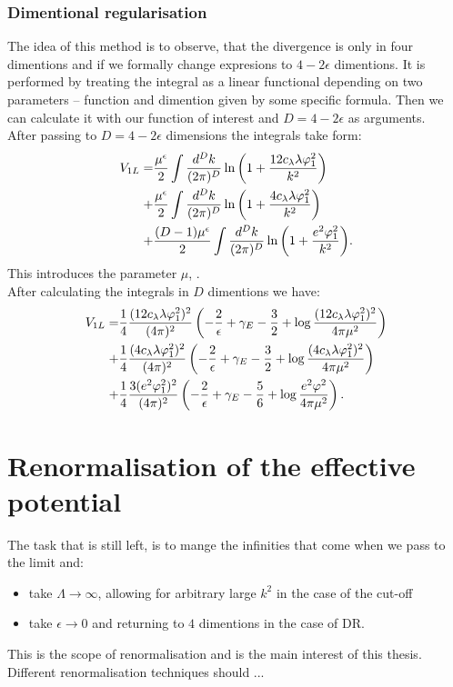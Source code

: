 \subsubsection{Dimentional regularisation}
The idea of this method is to observe, that the divergence is only in four dimentions 
and if we formally change expresions to $4-2\epsilon$ dimentions. 
It is performed by treating the integral as a linear functional depending on two parameters --
function and dimention given by some specific formula. Then we can calculate it with our 
function of interest and $D = 4-2\epsilon$ as arguments.  \\
After passing to $D=4-2\epsilon$ dimensions the integrals take form: 
\begin{align}
V_{1L}=&\frac{\mu^\epsilon}{2} \int\frac{d^Dk}{(2\pi)^D}\ln{\left(1+\frac{12c_\lambda\lambda\varphi_1^2}{k^2}
\right)}\\
+&\frac{\mu^\epsilon}{2} \int\frac{d^Dk}{(2\pi)^D}\ln{\left(1+\frac{4c_\lambda\lambda\varphi_1^2}{k^2}
\right)} \\ 
+&\frac{(D-1)\mu^\epsilon}{2} \int\frac{d^Dk}{(2\pi)^D}\ln{\left(1+\frac{e^2\varphi_1^2}{k^2}\right)}.
\end{align}
This introduces the parameter $\mu$, . \\
After calculating the integrals in $D$ dimentions we have:
\begin{align}
V_{1L}=&\frac{1}{4}\frac{(12c_\lambda\lambda\varphi_1^2)^2}{(4\pi)^2}\left(-\frac{2}{\epsilon}
+\gamma_E-\frac{3}{2}+\log{\frac{(12c_\lambda\lambda\varphi_1^2)^2}{4\pi\mu^2}}\right)  \\
+&\frac{1}{4}\frac{(4c_\lambda\lambda\varphi_1^2)^2}{(4\pi)^2}\left(-\frac{2}{\epsilon}
+\gamma_E-\frac{3}{2}+\log{\frac{(4c_\lambda\lambda\varphi_1^2)^2}{4\pi\mu^2}}\right)  \\
+&\frac{1}{4}\frac{3(e^2\varphi_1^2)^2}{(4\pi)^2}\left(-\frac{2}{\epsilon}+\gamma_E
-\frac{5}{6}+\log{\frac{e^2\varphi^2}{4\pi\mu^2}}\right).
\end{align}
\section{Renormalisation of the effective potential}
The task that is still left, is to mange the infinities that come when we pass to the limit 
and:
\begin{itemize} 
\item take $\Lambda \to \infty$, allowing for arbitrary large $k^2$ in the case of the cut-off
\item take $\epsilon \to 0$ and returning to $4$ dimentions in the case of DR.

\end{itemize}
This is the scope of renormalisation and is the main interest of this thesis. 
Different renormalisation techniques should ... 

